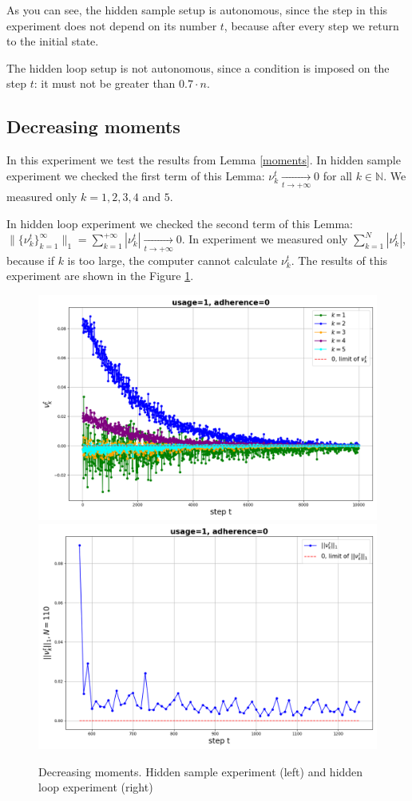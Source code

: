 \documentclass{article}
\begin{document}
        As you can see, the hidden sample setup is autonomous, since the step in this experiment does not depend on its number $t$, because after every step we return to the initial state.

        The hidden loop setup is not autonomous, since a condition is imposed on the step $t$: it must not be greater than $0.7 \cdot n$.

    \subsection{Decreasing moments} \label{exp_5}
        In this experiment we test the results from Lemma \ref{moments}. In hidden sample experiment we checked the first term of this Lemma: $\nu_k^t \underset{t \to +\infty}{\longrightarrow} 0$ for all $k \in \mathbb{N}$. We measured only $k = 1, 2, 3, 4$ and $5$. 

        In hidden loop experiment we checked the second term of this Lemma: $\|\{\nu_k^t\}_{k=1}^{\infty}\|_1 = \sum\limits_{k=1}^{+\infty} |\nu_k^t| \underset{t \to +\infty}{\longrightarrow} 0$. In experiment we measured only $\sum\limits_{k=1}^{N} |\nu_k^t|$, because if $k$ is too large, the computer cannot calculate $\nu_k^t$. The results of this experiment are shown in the Figure \ref{fig_exp_5}.
        
        \begin{figure}[h!]
            \centering
            \includegraphics[width=0.49\linewidth]{pictures/moments_sample_1_0.png}
            \includegraphics[width=0.49\linewidth]{pictures/moments_loop_1_0.png}
            
            \caption{Decreasing moments. Hidden sample experiment (left) and hidden loop experiment (right)}
            \label{fig_exp_5}
        \end{figure}
\end{document}
